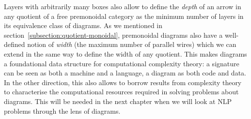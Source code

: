 Layers with arbitrarily many boxes also allow to define the \emph{depth} of an arrow in any quotient of a free premonoidal category as the minimum number of layers in its equivalence class of diagrams.
As we mentioned in section~\ref{subsection:quotient-monoidal}, premonoidal diagrams also have a well-defined notion of \emph{width} (the maximum number of parallel wires) which we can extend in the same way to define the width of any quotient.
This makes diagrams a foundational data structure for computational complexity theory: a signature can be seen as both a machine and a language, a diagram as both code and data.
In the other direction, this also allows to borrow results from complexity theory to characterise the computational resources required in solving problems about diagrams.
This will be needed in the next chapter when we will look at NLP problems through the lens of diagrams.
